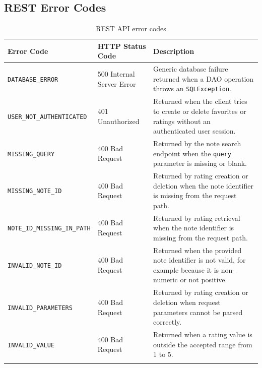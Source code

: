 \subsection{REST Error Codes}


\begin{longtable}{|p{}|p{} |p{}|} 
\hline
\textbf{Error Code} & \textbf{HTTP Status Code} & \textbf{Description} \\\hline
\texttt{DATABASE\_ERROR} & 500 Internal Server Error & Generic database failure returned when a DAO operation throws an \texttt{SQLException}. \\\hline
\texttt{USER\_NOT\_AUTHENTICATED} & 401 Unauthorized & Returned when the client tries to create or delete favorites or ratings without an authenticated user session. \\\hline
\texttt{MISSING\_QUERY} & 400 Bad Request & Returned by the note search endpoint when the \texttt{query} parameter is missing or blank. \\\hline
\texttt{MISSING\_NOTE\_ID} & 400 Bad Request & Returned by rating creation or deletion when the note identifier is missing from the request path. \\\hline
\texttt{NOTE\_ID\_MISSING\_IN\_PATH} & 400 Bad Request & Returned by rating retrieval when the note identifier is missing from the request path. \\\hline
\texttt{INVALID\_NOTE\_ID} & 400 Bad Request & Returned when the provided note identifier is not valid, for example because it is non-numeric or not positive. \\\hline
\texttt{INVALID\_PARAMETERS} & 400 Bad Request & Returned by rating creation or deletion when request parameters cannot be parsed correctly. \\\hline
\texttt{INVALID\_VALUE} & 400 Bad Request & Returned when a rating value is outside the accepted range from 1 to 5. \\\hline
\caption{REST API error codes}
\label{tab:rest-api-error-codes}
\end{longtable}
